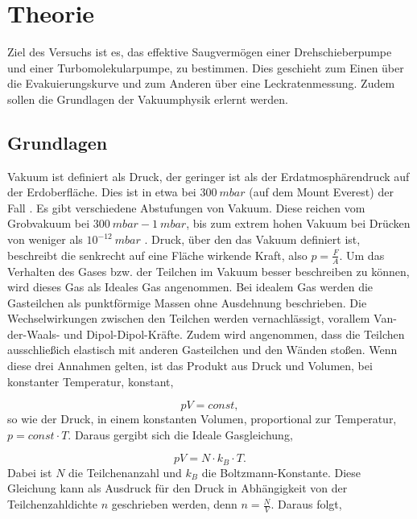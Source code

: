 \section{Theorie}
\label{sec:Theorie}
Ziel des Versuchs ist es, das effektive Saugvermögen einer Drehschieberpumpe und einer Turbomolekularpumpe, zu bestimmen.
Dies geschieht zum Einen über die Evakuierungskurve und zum Anderen über eine Leckratenmessung.
Zudem sollen die Grundlagen der Vakuumphysik erlernt werden.


\subsection{Grundlagen}
\label{sec:Grundlagen}
Vakuum ist definiert als Druck, der geringer ist als der Erdatmosphärendruck auf der Erdoberfläche.
Dies ist in etwa bei $300\: mbar$ (auf dem Mount Everest) der Fall \cite{Pfeiffer, S.9}.
Es gibt verschiedene Abstufungen von Vakuum. Diese reichen vom Grobvakuum bei $300\: mbar - 1\: mbar$, bis zum 
extrem hohen Vakuum bei Drücken von weniger als $10^{-12}\: mbar$ \cite{Pfeiffer, S.10}.
Druck, über den das Vakuum definiert ist, beschreibt die senkrecht auf eine Fläche wirkende Kraft, also $p = \frac{F}{A}$.
Um das Verhalten des Gases bzw. der Teilchen im Vakuum besser beschreiben zu können, wird dieses Gas als Ideales Gas angenommen.
Bei idealem Gas werden die Gasteilchen als punktförmige Massen ohne Ausdehnung beschrieben. 
Die Wechselwirkungen zwischen den Teilchen werden vernachlässigt, vorallem Van-der-Waals- und Dipol-Dipol-Kräfte.
Zudem wird angenommen, dass die Teilchen ausschließich elastisch mit anderen Gasteilchen und den Wänden stoßen.
Wenn diese drei Annahmen gelten, ist das Produkt aus Druck und Volumen, bei konstanter Temperatur, konstant, 

    \begin{equation}
    \label{equ:0}
        pV = const, 
    \end{equation}
so wie der Druck, in einem konstanten Volumen, proportional zur Temperatur, $p = const \cdot T$.
Daraus gergibt sich die Ideale Gasgleichung,

    \begin{equation}
    \label{equ:1}
        pV = N \cdot k_B \cdot T.
    \end{equation}
Dabei ist $N$ die Teilchenanzahl und $k_B$ die Boltzmann-Konstante.
Diese Gleichung kann als Ausdruck für den Druck in Abhängigkeit von der Teilchenzahldichte $n$ geschrieben werden, 
denn $n = \frac{N}{V}$.
Daraus folgt,

